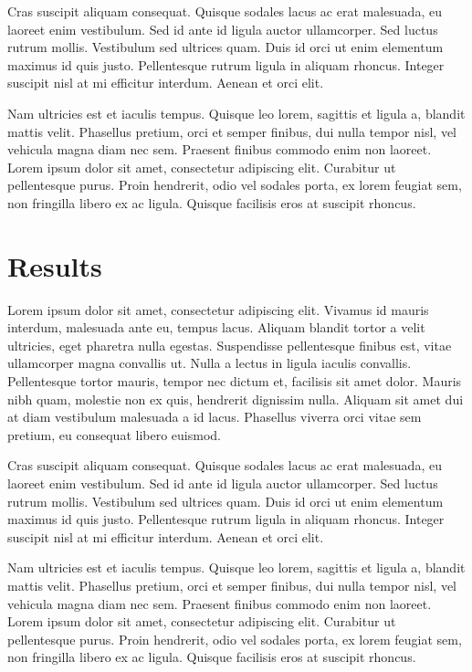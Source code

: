 \documentclass[a4paper, nobind]{templates/ociamthesis}
\theoremstyle{definition}
\theoremstyle{definition}
\theoremstyle{definition}
\theoremstyle{remark}
\begin{document}
Cras suscipit aliquam consequat. Quisque sodales lacus ac erat malesuada, eu laoreet enim vestibulum. Sed id ante id ligula auctor ullamcorper. Sed luctus rutrum mollis. Vestibulum sed ultrices quam. Duis id orci ut enim elementum maximus id quis justo. Pellentesque rutrum ligula in aliquam rhoncus. Integer suscipit nisl at mi efficitur interdum. Aenean et orci elit.

Nam ultricies est et iaculis tempus. Quisque leo lorem, sagittis et ligula a, blandit mattis velit. Phasellus pretium, orci et semper finibus, dui nulla tempor nisl, vel vehicula magna diam nec sem. Praesent finibus commodo enim non laoreet. Lorem ipsum dolor sit amet, consectetur adipiscing elit. Curabitur ut pellentesque purus. Proin hendrerit, odio vel sodales porta, ex lorem feugiat sem, non fringilla libero ex ac ligula. Quisque facilisis eros at suscipit rhoncus.

\hypertarget{results}{%
\section{Results}\label{results}}

Lorem ipsum dolor sit amet, consectetur adipiscing elit. Vivamus id mauris interdum, malesuada ante eu, tempus lacus. Aliquam blandit tortor a velit ultricies, eget pharetra nulla egestas. Suspendisse pellentesque finibus est, vitae ullamcorper magna convallis ut. Nulla a lectus in ligula iaculis convallis. Pellentesque tortor mauris, tempor nec dictum et, facilisis sit amet dolor. Mauris nibh quam, molestie non ex quis, hendrerit dignissim nulla. Aliquam sit amet dui at diam vestibulum malesuada a id lacus. Phasellus viverra orci vitae sem pretium, eu consequat libero euismod.

Cras suscipit aliquam consequat. Quisque sodales lacus ac erat malesuada, eu laoreet enim vestibulum. Sed id ante id ligula auctor ullamcorper. Sed luctus rutrum mollis. Vestibulum sed ultrices quam. Duis id orci ut enim elementum maximus id quis justo. Pellentesque rutrum ligula in aliquam rhoncus. Integer suscipit nisl at mi efficitur interdum. Aenean et orci elit.

Nam ultricies est et iaculis tempus. Quisque leo lorem, sagittis et ligula a, blandit mattis velit. Phasellus pretium, orci et semper finibus, dui nulla tempor nisl, vel vehicula magna diam nec sem. Praesent finibus commodo enim non laoreet. Lorem ipsum dolor sit amet, consectetur adipiscing elit. Curabitur ut pellentesque purus. Proin hendrerit, odio vel sodales porta, ex lorem feugiat sem, non fringilla libero ex ac ligula. Quisque facilisis eros at suscipit rhoncus.
\end{document}
